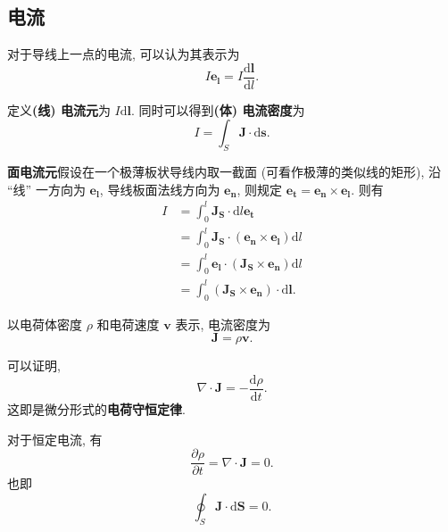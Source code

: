 \subsection{电流}
对于导线上一点的电流, 可以认为其表示为
\begin{equation*}
    I\bm{e_l}=I\frac{\mathrm{d}\bm{l}}{\mathrm{d}l}.
\end{equation*}

定义\textbf{(线) 电流元}为 $I\mathrm{d}\bm{l}$. 同时可以得到\textbf{(体) 电流密度}为
\begin{equation}
    I=\int_S\bm{J}\cdot\mathrm{d}\bm{s}.
\end{equation}

\textbf{面电流元}\quad 假设在一个极薄板状导线内取一截面 (可看作极薄的类似线的矩形), 沿 ``线'' 一方向为 $\bm{e_l}$, 导线板面法线方向为 $\bm{e_n}$, 则规定 $\bm{e_t}=\bm{e_n}\times\bm{e_l}$. 则有
\begin{equation}
    \begin{aligned}
        I & =\int_{0}^{l}\bm{J_S}\cdot\mathrm{d}l\bm{e_t}                 \\
          & =\int_{0}^{l}\bm{J_S}\cdot(\bm{e_n}\times\bm{e_l})\mathrm{d}l \\
          & =\int_{0}^{l}\bm{e_l}\cdot(\bm{J_S}\times\bm{e_n})\mathrm{d}l \\
          & =\int_{0}^{l}(\bm{J_S}\times\bm{e_n})\cdot\mathrm{d}\bm{l}.
    \end{aligned}
\end{equation}

以电荷体密度 $\rho$ 和电荷速度 $\bm{v}$ 表示, 电流密度为
\begin{equation}
    \bm{J}=\rho\bm{v}.
\end{equation}

可以证明,
\begin{equation}
    \nabla\cdot\bm{J}=-\frac{\mathrm{d}\rho}{\mathrm{d}t}.
\end{equation}
这即是微分形式的\textbf{电荷守恒定律}.

对于恒定电流, 有
\begin{equation}
    \frac{\partial\rho}{\partial t}=\nabla\cdot\bm{J}=0.
\end{equation}
也即
\begin{equation}
    \oint_S\bm{J}\cdot\mathrm{d}\bm{S}=0.
\end{equation}
